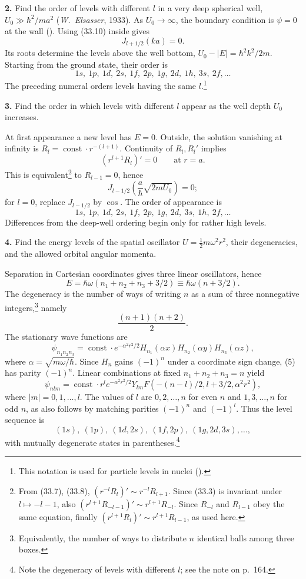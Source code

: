 \textbf{2.} Find the order of levels with different $l$ in a very deep
spherical well, $U_0\gg\hbar^2/ma^2$ (\emph{W.~Elsasser}, 1933).
\SolutionHeading As $U_0\to\infty$, the boundary condition is $\psi=0$ at
the wall (). Using (33.10) inside gives
\[J_{l+1/2}(ka)=0.\]
Its roots determine the levels above the well bottom,
$U_0-|E|=\hbar^2k^2/2m$. Starting from the ground state, their order is
\[1s,\ 1p,\ 1d,\ 2s,\ 1f,\ 2p,\ 1g,\ 2d,\ 1h,\ 3s,\ 2f,\ldots\]
The preceding numeral orders levels having the same $l$.\footnote{This
notation is used for particle levels in nuclei ().}

\textbf{3.} Find the order in which levels with different $l$ appear as the
well depth $U_0$ increases.

\SolutionHeading At first appearance a new level has $E=0$. Outside, the
solution vanishing at infinity is $R_l=\operatorname{const}\cdot r^{-(l+1)}$.
Continuity of $R_l,R_l'$ implies
\[(r^{l+1}R_l)'=0\qquad\text{at }r=a.\]
This is equivalent\footnote{From (33.7), (33.8),
$(r^{-l}R_l)'\sim r^{-l}R_{l+1}$. Since (33.3) is invariant under
$l\mapsto-l-1$, also
$(r^{l+1}R_{-l-1})'\sim r^{l+1}R_{-l}$. Since $R_{-l}$ and $R_{l-1}$ obey
the same equation, finally
$(r^{l+1}R_l)'\sim r^{l+1}R_{l-1}$, as used here.} to $R_{l-1}=0$, hence
\[J_{l-1/2}\left(\frac a\hbar\sqrt{2mU_0}\right)=0;\]
for $l=0$, replace $J_{l-1/2}$ by $\cos$. The order of appearance is
\[1s,\ 1p,\ 1d,\ 2s,\ 1f,\ 2p,\ 1g,\ 2d,\ 3s,\ 1h,\ 2f,\ldots\]
Differences from the deep-well ordering begin only for rather high levels.

\textbf{4.} Find the energy levels of the spatial oscillator
$U=\tfrac12m\omega^2r^2$, their degeneracies, and the allowed orbital angular
momenta.

\SolutionHeading Separation in Cartesian coordinates gives three linear
oscillators, hence
\[E=\hbar\omega(n_1+n_2+n_3+3/2)\equiv\hbar\omega(n+3/2).\]
The degeneracy is the number of ways of writing $n$ as a sum of three
nonnegative integers,\footnote{Equivalently, the number of ways to distribute
$n$ identical balls among three boxes.} namely
\[\frac{(n+1)(n+2)}2.\]
The stationary wave functions are
\begin{equation}
 \psi_{n_1n_2n_3}=\operatorname{const}\cdot e^{-\alpha^2r^2/2}
 H_{n_1}(\alpha x)H_{n_2}(\alpha y)H_{n_3}(\alpha z),\tag{5}
\end{equation}
where $\alpha=\sqrt{m\omega/\hbar}$. Since $H_n$ gains $(-1)^n$ under a
coordinate sign change, (5) has parity $(-1)^n$. Linear combinations at fixed
$n_1+n_2+n_3=n$ yield
\begin{equation}
 \psi_{nlm}=\operatorname{const}\cdot r^le^{-\alpha^2r^2/2}Y_{lm}
 F(-(n-l)/2,l+3/2,\alpha^2r^2),\tag{6}
\end{equation}
where $|m|=0,1,\ldots,l$. The values of $l$ are $0,2,\ldots,n$ for even $n$
and $1,3,\ldots,n$ for odd $n$, as also follows by matching parities
$(-1)^n$ and $(-1)^l$. Thus the level sequence is
\[(1s),\ (1p),\ (1d,2s),\ (1f,2p),\ (1g,2d,3s),\ldots,\]
with mutually degenerate states in parentheses.\footnote{Note the degeneracy
of levels with different $l$; see the note on p.~164.}
